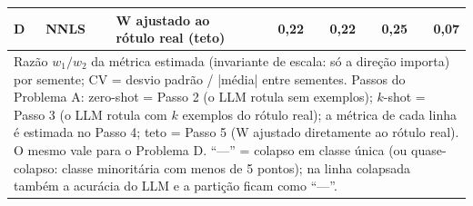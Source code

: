 \begin{table}[htbp]
\begin{tabular}{lllrrrr}
D & NNLS & W ajustado ao rótulo real (teto) & 0,22 & 0,22 & 0,25 & 0,07 \\
\bottomrule
\multicolumn{7}{p{0.95\linewidth}}{\footnotesize Razão $w_1/w_2$ da métrica estimada (invariante de escala: só a direção importa) por semente; CV = desvio padrão / |média| entre sementes. Passos do Problema A: zero-shot = Passo 2 (o LLM rotula sem exemplos); $k$-shot = Passo 3 (o LLM rotula com $k$ exemplos do rótulo real); a métrica de cada linha é estimada no Passo 4; teto = Passo 5 (W ajustado diretamente ao rótulo real). O mesmo vale para o Problema D. ``—'' = colapso em classe única (ou quase-colapso: classe minoritária com menos de 5 pontos); na linha colapsada também a acurácia do LLM e a partição ficam como ``—''.} \\
\end{tabular}
\end{table}
